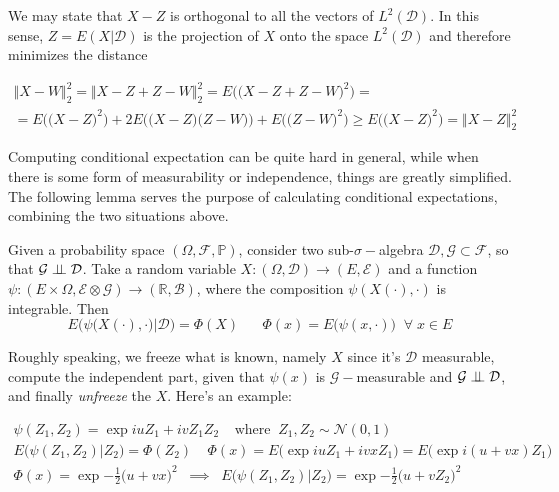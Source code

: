 We may state that $X-Z$ is orthogonal to all the vectors of $L^2(\mathcal{D})$. In this sense, $Z = E(X \vert \mathcal{D})$ is the projection of $X$ onto the space $L^2(\mathcal{D})$ and therefore minimizes the distance

\begin{gather*}
    \Vert X - W \Vert_2^2 = \Vert X - Z + Z - W \Vert_2^2 = E\Big( \big( X - Z + Z - W\big)^2 \Big) = \\
    = E\Big( \big(X-Z\big)^2 \Big) + 2 E\Big( \big(X-Z\big)\big(Z-W\big) \Big) + E\Big( \big(Z-W\big)^2 \Big) \geq E\Big( \big(X-Z\big)^2 \Big) = \Vert X-Z \Vert_2^2
\end{gather*}

Computing conditional expectation can be quite hard in general, while when there is some form of measurability or independence, things are greatly simplified. The following lemma serves the purpose of calculating conditional expectations, combining the two situations above. 

\begin{lemma}[Freezing]
    Given a probability space $(\Omega, \mathcal{F}, \mathbb{P})$, consider two sub-$\sigma-$algebra $\mathcal{D},\mathcal{G} \subset \mathcal{F}$, so that $\mathcal{G} \perp \!\!\! \perp \mathcal{D}$. Take a random variable $X : (\Omega, \mathcal{D}) \to (E, \mathcal{E})$ and a function $\psi : (E \times \Omega, \mathcal{E} \otimes \mathcal{G}) \to (\mathbb{R}, \mathcal{B})$, where the composition $\psi(X(\cdot),\cdot)$ is integrable. Then
    \begin{equation}
        E\Big(\psi\big(X(\cdot),\cdot\big) \big\vert \mathcal{D} \Big) = \Phi(X) \;\;\;\;\;\; \Phi(x) = E\big(\psi(x,\cdot)\big) \;\; \forall \; x \in E 
    \end{equation}
\end{lemma}

Roughly speaking, we freeze what is known, namely $X$ since it's $\mathcal{D}$ measurable, compute the independent part, given that $\psi(x)$ is $\mathcal{G}-$measurable and $\mathcal{G}\perp \!\!\! \perp\mathcal{D}$, and finally \textit{unfreeze} the $X$. Here's an example:

\begin{gather*}
    \psi(Z_1,Z_2) = \exp{i u Z_1+iv Z_1 Z_2} \;\;\;\; \text{where} \;\; Z_1,Z_2 \sim \mathcal{N}(0,1) \\
    E\Big( \psi(Z_1,Z_2) \vert Z_2 \Big) = \Phi(Z_2) \;\;\;\; \Phi(x) = E\big( \exp{iuZ_1+ivx Z_1} \big) = E\big( \exp{i(u+vx)Z_1} \big) \\
    \Phi(x) = \exp{-\frac{1}{2}\big(u+vx\big)^2} \;\; \implies \;\; E\Big( \psi(Z_1,Z_2) \vert Z_2 \Big) = \exp{-\frac{1}{2}\big(u+vZ_2\big)^2}
\end{gather*}

